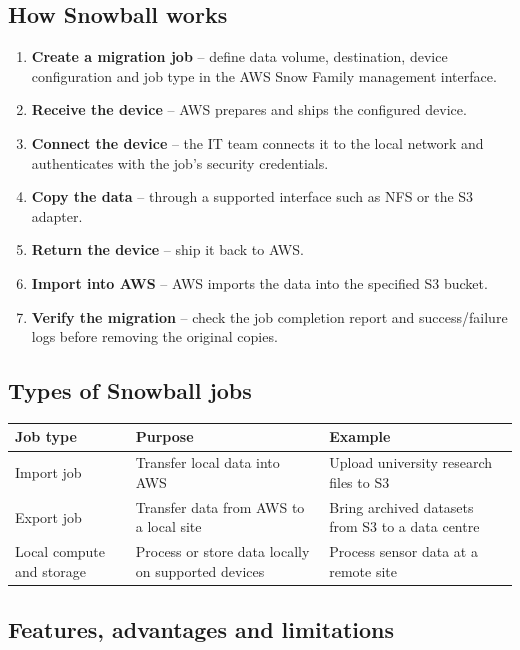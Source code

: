\documentclass[11pt,a4paper]{article}
\begin{document}
\subsection{How Snowball works}

\begin{enumerate}\itemsep2pt
  \item \textbf{Create a migration job} -- define data volume, destination, device
        configuration and job type in the AWS Snow Family management interface.
  \item \textbf{Receive the device} -- AWS prepares and ships the configured device.
  \item \textbf{Connect the device} -- the IT team connects it to the local network and
        authenticates with the job's security credentials.
  \item \textbf{Copy the data} -- through a supported interface such as NFS or the S3
        adapter.
  \item \textbf{Return the device} -- ship it back to AWS.
  \item \textbf{Import into AWS} -- AWS imports the data into the specified S3 bucket.
  \item \textbf{Verify the migration} -- check the job completion report and success/failure
        logs before removing the original copies.
\end{enumerate}

\subsection{Types of Snowball jobs}

\begin{tabularx}{\textwidth}{@{}lXX@{}}
\toprule
\rowcolor{tablehead}\textbf{Job type} & \textbf{Purpose} & \textbf{Example} \\
\midrule
Import job & Transfer local data into AWS & Upload university research files to S3 \\
\addlinespace
Export job & Transfer data from AWS to a local site & Bring archived datasets from S3 to a data
  centre \\
\addlinespace
Local compute and storage & Process or store data locally on supported devices & Process
  sensor data at a remote site \\
\bottomrule
\end{tabularx}

\subsection{Features, advantages and limitations}
\end{document}
